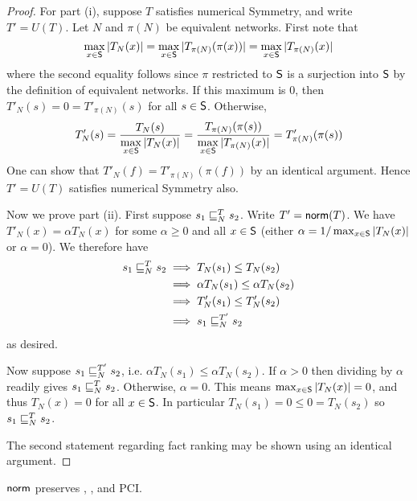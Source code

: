 \begin{proof}
For part (i), suppose $T$ satisfies numerical Symmetry, and write $T' = U(T)$. Let $N$ and
$\pi(N)$ be equivalent networks. First note that
\[
    \max_{x \in \S}{|T_N(x)|}
    = \max_{x \in \S}{|T_{\pi(N)}(\pi(x))}|
    = \max_{x \in \S}{|T_{\pi(N)}(x)|}
\]
where the second equality follows since $\pi$ restricted to $\S$ is a
surjection into $\S$ by the definition of equivalent networks. If this maximum
is 0, then $T'_N(s)=0=T'_{\pi(N)}(s)$ for all $s \in \S$. Otherwise,
\[
    T'_N(s)
    = \frac{T_N(s)}{\max\limits_{x \in \S}{|T_N(x)|}}
    = \frac{T_{\pi(N)}(\pi(s))}{\max\limits_{x \in \S}{|T_{\pi(N)}(x)|}}
    = T'_{\pi(N)}(\pi(s))
\]
One can show that $T'_N(f) = T'_{\pi(N)}(\pi(f))$ by an identical argument.
Hence $T'=U(T)$ satisfies numerical Symmetry also.

Now we prove part (ii). First suppose $s_1 \sle_N^T s_2$. Write $T' =
\norm(T)$. We have $T'_N(x) = \alpha T_N(x)$ for some $\alpha \ge 0$ and all $x
\in \S$ (either $\alpha = 1 / \max_{x \in \S}{|T_N(x)|}$ or $\alpha = 0$). We
therefore have
\begin{align*}
    s_1 \sle_N^T s_2
    & \implies T_N(s_1) \le T_N(s_2) \\
    & \implies \alpha T_N(s_1) \le \alpha T_N(s_2) \\
    & \implies T'_N(s_1) \le T'_N(s_2) \\
    & \implies s_1 \sle_N^{T'} s_2
\end{align*}
as desired.

Now suppose $s_1 \sle_N^{T'} s_2$, i.e. $\alpha T_N(s_1) \le \alpha T_N(s_2)$.
If $\alpha > 0$ then dividing by $\alpha$ readily gives $s_1 \sle_N^T s_2$.
Otherwise, $\alpha = 0$. This means $\max_{x \in \S}{|T_N(x)|} = 0$, and thus
$T_N(x) = 0$ for all $x \in \S$. In particular $T_N(s_1) = 0 \le 0 = T_N(s_2)$
so $s_1 \sle_N^T s_2$.

The second statement regarding fact ranking may be shown using an identical
argument.
\end{proof}

\begin{corollary}
\label{td_cor_norm_preservation}
    $\norm$ preserves \coherence{}, \unanimity{}, \groundedness{} and PCI.
\end{corollary}


